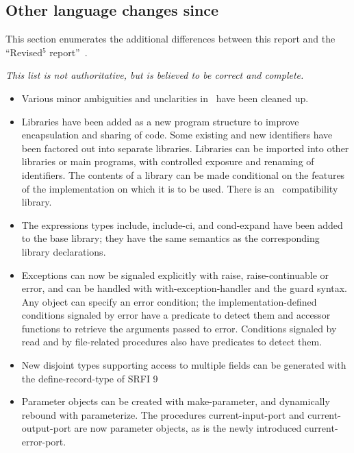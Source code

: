 \subsection*{Other language changes since \rfivers}
\label{differences}
This section enumerates the additional differences between this report and
the ``Revised$^5$ report''~\cite{R5RS}.

{\em This list is not authoritative, but is believed to be correct and complete.}

\begin{itemize}

\item Various minor ambiguities and unclarities in \rfivers\ have been cleaned up.

\item Libraries have been added as a new program structure to improve
encapsulation and sharing of code.  Some existing and new identifiers
have been factored out into separate libraries.
Libraries can be imported into other libraries or main programs, with
controlled exposure and renaming of identifiers.
The contents of a library can be made conditional on the features of
the implementation on which it is to be used.
There is an \rfivers\ compatibility library.

\item The expressions types {\cf include}, {\cf include-ci}, and {\cf cond-expand}
have been added to the base library; they have the same semantics as the
corresponding library declarations.

\item Exceptions can now be signaled explicitly with {\cf raise},
{\cf raise-continuable} or {\cf error}, and can be handled with {\cf
with-exception-handler} and the {\cf guard} syntax.
Any object can specify an error condition; the implementation-defined
conditions signaled by {\cf error} have a predicate to detect them and accessor functions to
retrieve the arguments passed to {\cf error}.
Conditions signaled by {\cf read} and by file-related procedures
also have predicates to detect them.

\item New disjoint types supporting access to multiple fields can be
generated with the {\cf define-record-type} of SRFI 9~\cite{srfi9}

\item Parameter objects can be created with {\cf make-parameter}, and
dynamically rebound with {\cf parameterize}.
The procedures {\cf current-input-port} and {\cf current-output-port} are now
parameter objects, as is the newly introduced {\cf current-error-port}.


\end{itemize}
